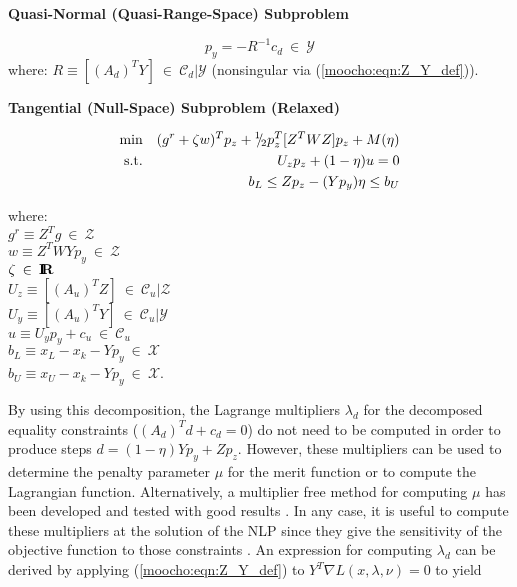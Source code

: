 \documentclass[pdf,ps2pdf,11pt]{SANDreport}
\begin{document}
{{{\bsinglespace
\begin{center}\textbf{Quasi-Normal (Quasi-Range-Space) Subproblem}\end{center}
\begin{equation}
p_y = - R^{-1} c_d \:\in\:\mathcal{Y}
\label{moocho:eqn:range_space_step}
\end{equation}
\hspace{4ex}where: $R \equiv [(A_d)^T Y]  \:\in\:\mathcal{C}_d|\mathcal{Y}$
	(nonsingular via (\ref{moocho:eqn:Z_Y_def})). \\[2ex]

\begin{center}\textbf{Tangential (Null-Space) Subproblem (Relaxed)}\end{center}
\begin{eqnarray}
\mbox{min}  &  & (g^r + \zeta w)^T p_z + {}^1 \!\! / \! {}_2 p_z^T [Z^T W Z] p_z + M(\eta)
                 \label{moocho:eqn:rsqp:obj} \\
\mbox{s.t.} &  & U_z p_z + (1-\eta) u = 0 
                 \label{moocho:eqn:rsqp:equ} \\
            &  & b_L \leq Z p_z - (Y p_y) \eta \leq b_U	
                 \label{moocho:eqn:rsqp:inequ}
\end{eqnarray}
\begin{tabbing}
\hspace{4ex}where:\hspace{5ex}\= \\
\>	$g^r \equiv Z^T g \:\in\:\mathcal{Z}$ \\
\>	$w \equiv Z^T W Y p_y \:\in\:\mathcal{Z}$ \\
\>	$\zeta \:\in\:\mbox{\textbf{I}}\hspace{-0.6ex}\mbox{\textbf{R}}$ \\
\>	$U_z \equiv [(A_u)^T Z] \:\in\:\mathcal{C}_u|\mathcal{Z}$ \\
\>	$U_y \equiv [(A_u)^T Y] \:\in\:\mathcal{C}_u|\mathcal{Y}$ \\
\>  $u   \equiv U_y p_y + c_u \:\in\:\mathcal{C}_u$ \\
\>	$b_L \equiv x_L - x_k - Y p_y \:\in\:\mathcal{X}$ \\
\>	$b_U \equiv x_U - x_k - Y p_y \:\in\:\mathcal{X}$.
\end{tabbing}
\esinglespace}

By using this decomposition, the Lagrange multipliers $\lambda_d$ for the
decomposed equality constraints ($(A_d)^T d + c_d = 0$) do not need to be
computed in order to produce steps $d = (1-\eta) Y p_y + Z p_z$.  However,
these multipliers can be used to determine the penalty parameter $\mu$ for the
merit function {}\cite[page 544]{ref:nocedal_wright_1999} or to compute the
Lagrangian function.  Alternatively, a multiplier free method for computing
$\mu$ has been developed and tested with good results
{}\cite{ref:schmid_rsqp_1994}.  In any case, it is useful to compute these
multipliers at the solution of the NLP since they give the sensitivity of the
objective function to those constraints {}\cite[page
436]{ref:nash_sofer_1996}.  An expression for computing $\lambda_d$ can be
derived by applying (\ref{moocho:eqn:Z_Y_def}) to $Y^T \nabla
L(x,\lambda,\nu)=0$ to yield

}}
\end{document}
